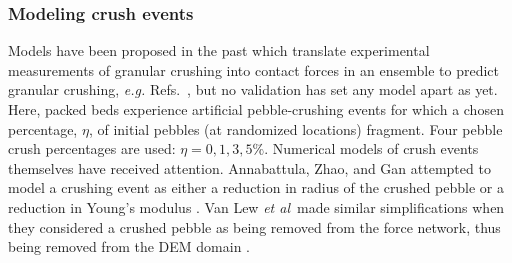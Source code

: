 \begin{table}[ht]
\centering
\caption{Transport properties of helium and boundary conditions in the CFD domain; mean values over the temperature range \SIrange{400}{900}{\celsius}.}
\label{tab:fluid-props}
\end{table}



\subsubsection{Modeling crush events}
Models have been proposed in the past which translate experimental measurements of granular crushing into contact forces in an ensemble to predict granular crushing, \textit{e.g.} Refs.~\cite{Gan:2010kc,Russell2009,Zhao2012,VanLew2015,Annabattula2014}, but no validation has set any model apart as yet. Here, packed beds experience artificial pebble-crushing events for which a chosen percentage, $\eta$, of initial pebbles (at randomized locations) fragment. Four pebble crush percentages are used: $\eta = 0, 1, 3, 5\%$. Numerical models of crush events themselves have received attention. Annabattula, Zhao, and Gan attempted to model a crushing event as either a reduction in radius of the crushed pebble or a reduction in Young's modulus \cite{Annabattula2011,Zhao2013,Annabattula2012a}. Van Lew \textit{et al}~made similar simplifications when they considered a crushed pebble as being removed from the force network, thus being removed from the DEM domain \cite{VanLew2014}. 

